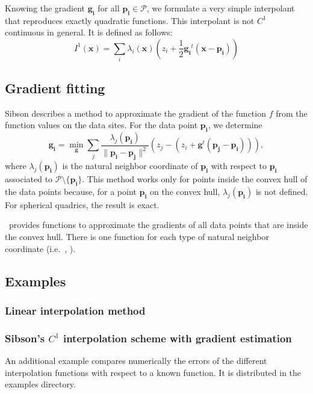 Knowing the gradient $\mathbf{g_i}$ for all $\mathbf{p_i} \in
\mathcal{P}$, we formulate a very simple interpolant that reproduces
exactly quadratic functions. This interpolant is not $C^1$ continuous
in general.  It is defined as follows:
\begin{displaymath}
  I^1(\mathbf{x}) = \sum_i \lambda_i(\mathbf{x}) 
  (z_i + \frac{1}{2} \mathbf{g_i}^t (\mathbf{x} - \mathbf{p_i}))  
\end{displaymath} 



\subsection{Gradient fitting} \label{s:gradient_fitting}
Sibson describes a method to approximate the gradient of the function
$f$ from the function values on the data sites. For the data point
$\mathbf{p_i}$, we determine
$$\mathbf{g_i} = \min_{\mathbf{g}} \sum_j
\frac{\lambda_j(\mathbf{p_i})}{\|\mathbf{p_i} - \mathbf{p_j}\|^2}
\left( z_j - (z_i + \mathbf{g}^t (\mathbf{p_j} -\mathbf{p_i})) \right),
$$
where $\lambda_j(\mathbf{p_i})$ is the natural neighbor coordinate
of $\mathbf{p_i}$ with respect to $\mathbf{p_i}$ associated to
$\mathcal{P} \setminus \{\mathbf{p_i}\}$. This method works only for
points inside the convex hull of the data points because, for a point
$\mathbf{p_i}$ on the convex hull, $\lambda_j(\mathbf{p_i})$ is not
defined. For spherical quadrics, the result is exact.

\cgal\ provides functions to approximate the gradients of all data
points that are inside the convex hull. There is one function for each
type of natural neighbor coordinate (i.e.\ , ).


\subsection{Examples}\label{subsec:interpol_examples}
\subsubsection{Linear interpolation method}

\subsubsection{Sibson's $C^1$ interpolation scheme with gradient estimation}

An additional example compares numerically the errors of the different 
interpolation functions with respect to a known function. 
It is distributed in the examples directory.

